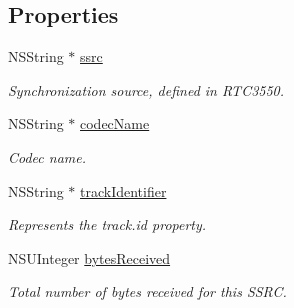 \subsection*{Properties}
\begin{DoxyCompactItemize}
\item 
\mbox{\label{interface_c_c_audio_receive_status_a391e6db7e76fe6c059593d41a3b5e3a6}} 
N\+S\+String $\ast$ \hyperlink{interface_c_c_audio_receive_status_a391e6db7e76fe6c059593d41a3b5e3a6}{ssrc}
\begin{DoxyCompactList}\small\item\em Synchronization source, defined in R\+T\+C3550. \end{DoxyCompactList}\item 
\mbox{\label{interface_c_c_audio_receive_status_aa5b5e5ff2c9ddb42fcc7e85afdb4e8fb}} 
N\+S\+String $\ast$ \hyperlink{interface_c_c_audio_receive_status_aa5b5e5ff2c9ddb42fcc7e85afdb4e8fb}{codec\+Name}
\begin{DoxyCompactList}\small\item\em Codec name. \end{DoxyCompactList}\item 
\mbox{\label{interface_c_c_audio_receive_status_a2111d2d9142e2c1c426f8586e07b0698}} 
N\+S\+String $\ast$ \hyperlink{interface_c_c_audio_receive_status_a2111d2d9142e2c1c426f8586e07b0698}{track\+Identifier}
\begin{DoxyCompactList}\small\item\em Represents the track.\+id property. \end{DoxyCompactList}\item 
\mbox{\label{interface_c_c_audio_receive_status_a6a349621795d42ac146137973ed6926a}} 
N\+S\+U\+Integer \hyperlink{interface_c_c_audio_receive_status_a6a349621795d42ac146137973ed6926a}{bytes\+Received}
\begin{DoxyCompactList}\small\item\em Total number of bytes received for this S\+S\+RC. \end{DoxyCompactList}\item 
\mbox{\label{interface_c_c_audio_receive_status_a4c37e1a3729be1e4e875c803001b246f}} 

\end{DoxyCompactItemize}
